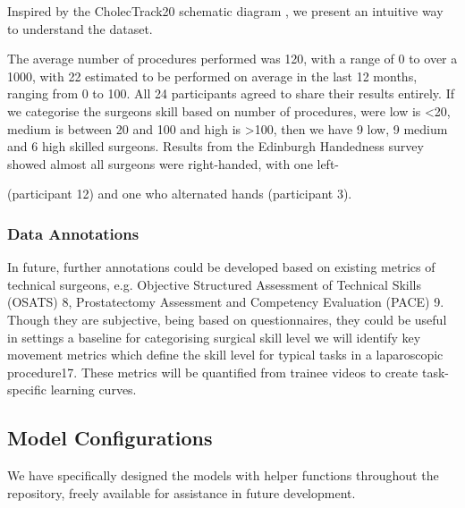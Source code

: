Inspired by the CholecTrack20 schematic diagram \cite{nwoye_cholectrack20_2023}, we present an intuitive way to understand the dataset.

The average number of procedures performed was 120, with a range of 0 to over a 1000, with 22 estimated to be performed on average in the last 12 months, ranging from 0 to 100. All 24 participants agreed to share their results entirely. If we categorise the surgeons skill based on number of procedures, were low is <20, medium is between 20 and 100 and high is >100, then we have 9 low, 9 medium and 6 high skilled surgeons. Results from the Edinburgh Handedness survey \cite{oldfield_assessment_1971} showed almost all surgeons were right-handed, with one left-\usepackage{multirow}
 (participant 12) and one who alternated hands (participant 3).

\subsubsection{Data Annotations}



In future, further annotations could be developed based on existing metrics of technical surgeons, e.g. Objective Structured Assessment of Technical Skills (OSATS) 8, Prostatectomy Assessment and Competency Evaluation (PACE) 9.
Though they are subjective, being based on questionnaires, they could be useful in settings a baseline for categorising surgical skill level 
we will identify key movement metrics which define the skill level for typical tasks in a laparoscopic procedure17. These metrics will be quantified from trainee videos to create task-specific learning curves.


\subsection{Model Configurations}

We have specifically designed the models with helper functions throughout the repository, freely available for assistance in future development.

